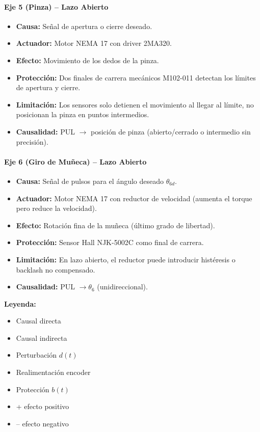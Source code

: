 \documentclass[11pt]{article}
\begin{document}
\paragraph{Eje 5 (Pinza) – Lazo Abierto}
\begin{itemize}
	\item \textbf{Causa:} Señal de apertura o cierre deseado.
	\item \textbf{Actuador:} Motor NEMA 17 con driver 2MA320.
	\item \textbf{Efecto:} Movimiento de los dedos de la pinza.
	\item \textbf{Protección:} Dos finales de carrera mecánicos M102-011 detectan los límites de apertura y cierre.
	\item \textbf{Limitación:} Los sensores solo detienen el movimiento al llegar al límite, no posicionan la pinza en puntos intermedios.
	\item \textbf{Causalidad:} PUL $\rightarrow$ posición de pinza (abierto/cerrado o intermedio sin precisión).
\end{itemize}

\paragraph{Eje 6 (Giro de Muñeca) – Lazo Abierto}
\begin{itemize}
	\item \textbf{Causa:} Señal de pulsos para el ángulo deseado $\theta_{6d}$.
	\item \textbf{Actuador:} Motor NEMA 17 con reductor de velocidad (aumenta el torque pero reduce la velocidad).
	\item \textbf{Efecto:} Rotación fina de la muñeca (último grado de libertad).
	\item \textbf{Protección:} Sensor Hall NJK-5002C como final de carrera.
	\item \textbf{Limitación:} En lazo abierto, el reductor puede introducir histéresis o backlash no compensado.
	\item \textbf{Causalidad:} PUL $\rightarrow \theta_6$ (unidireccional).
\end{itemize}

\textbf{Leyenda:}
\begin{itemize}
	\item Causal directa
	\item Causal indirecta
	\item Perturbación $d(t)$
	\item Realimentación encoder
	\item Protección $b(t)$
	\item + efecto positivo
	\item – efecto negativo
\end{itemize}
\end{document}
